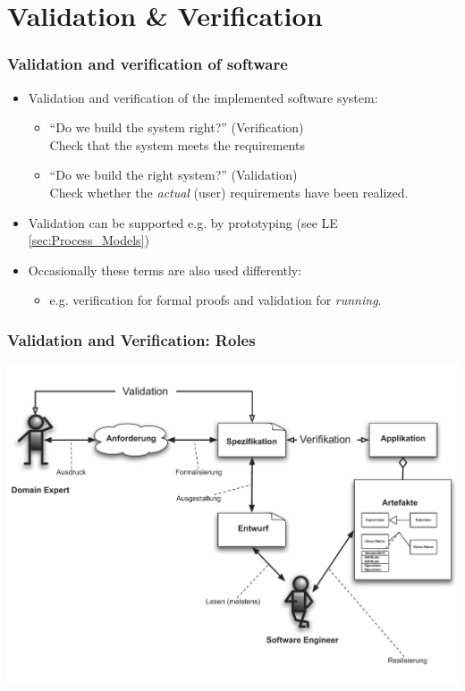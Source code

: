 
\section{Validation \& Verification}


\begin{frame}
\frametitle{Validation and verification of software}
\begin{itemize}
  \item Validation and verification of the implemented software system:%
    \begin{itemize}
      \item "`Do we build the system right?"' (Verification)\\
            Check  that the system meets the requirements
      \item "`Do we build the right system?"' (Validation)\\
            Check whether the \emph{actual} (user) requirements have been realized.
    \end{itemize}
  \item Validation can be supported e.g. by prototyping (see LE \ref{sec:Process_Models})
  \item Occasionally these terms are also used differently:
    \begin{itemize}
      \item e.g. verification for formal proofs and validation for \emph{running}.
    \end{itemize}
\end{itemize}
\end{frame}


\begin{frame}\frametitle{Validation and Verification: Roles}
\begin{center}
\includegraphics[width=\textwidth]{images/Qualitaetssicherung/abbildungen/ValidationVerifikation}
\end{center}
\end{frame}

